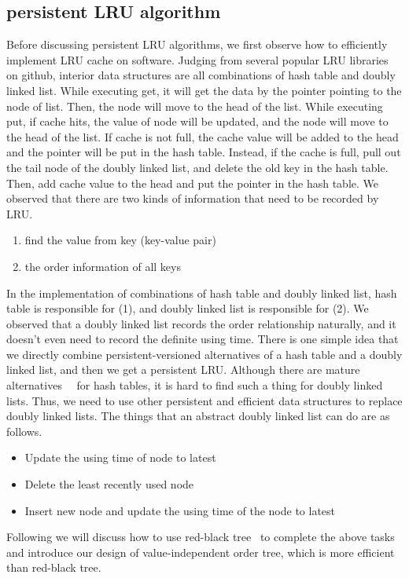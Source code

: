 \documentclass[conference]{IEEEtran}
\begin{document}
\subsection{persistent LRU algorithm}
Before discussing persistent LRU algorithms, we first observe how to efficiently implement LRU cache on software. Judging from several popular LRU libraries on github, interior data structures are all combinations of hash table and doubly linked list.
While executing get, it will get the data by the pointer pointing to the node of list. Then, the node will move to the head of the list. While executing put, if cache hits, the value of node will be updated, and the node will move to the head of the list. If cache is not full, the cache value will be added to the head and the pointer will be put in the hash table. Instead, if the cache is full, pull out the tail node of the doubly linked list, and delete the old key in the hash table. Then, add cache value to the head and put the pointer in the hash table.
We observed that there are two kinds of information that need to be recorded by LRU.
\begin{enumerate}
  \item find the value from key (key-value pair)
  \item the order information of all keys
\end{enumerate}
In the implementation of combinations of hash table and doubly linked list, hash table is responsible for (1), and doubly linked list is responsible for (2). We observed that a doubly linked list records the order relationship naturally, and it doesn't even need to record the definite using time.
There is one simple idea that we directly combine persistent-versioned alternatives of a hash table and a doubly linked list, and then we get a persistent LRU. Although there are mature alternatives~\cite{b5}~\cite{b6} for hash tables, it is hard to find such a thing for doubly linked lists.
Thus, we need to use other persistent and efficient data structures to replace doubly linked lists. The things that an abstract doubly linked list can do are as follows.
\begin{itemize}
\item Update the using time of node to latest
\item Delete the least recently used node
\item Insert new node and update the using time of the node to latest
\end{itemize}
Following we will discuss how to use red-black tree~\cite{b7} to complete the above tasks and introduce our design of value-independent order tree, which is more efficient than red-black tree.
\end{document}
